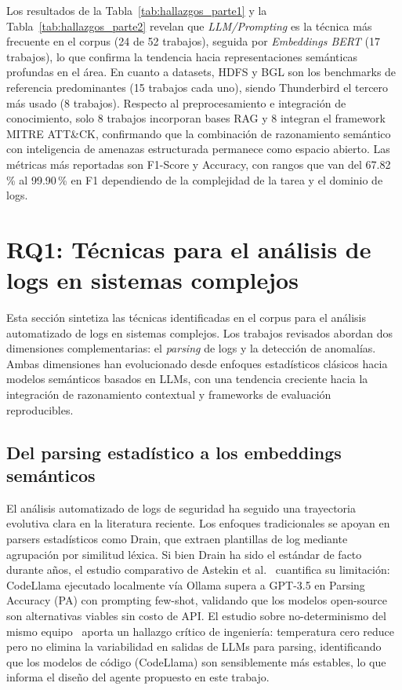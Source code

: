 Los resultados de la Tabla~\ref{tab:hallazgos_parte1} y la
Tabla~\ref{tab:hallazgos_parte2} revelan que \textit{LLM/Prompting}
es la técnica más frecuente en el corpus (24 de 52 trabajos),
seguida por \textit{Embeddings BERT} (17 trabajos), lo que confirma
la tendencia hacia representaciones semánticas profundas en el área.
En cuanto a datasets, HDFS y BGL son los benchmarks de referencia
predominantes (15 trabajos cada uno), siendo Thunderbird el tercero
más usado (8 trabajos). Respecto al preprocesamiento e integración
de conocimiento, solo 8 trabajos incorporan bases RAG y 8 integran
el framework MITRE ATT\&CK, confirmando que la combinación de
razonamiento semántico con inteligencia de amenazas estructurada
permanece como espacio abierto. Las métricas más reportadas son
F1-Score y Accuracy, con rangos que van del 67.82\,\% al 99.90\,\%
en F1 dependiendo de la complejidad de la tarea y el dominio de logs.
 


\section{RQ1: Técnicas para el análisis de logs en sistemas
  complejos}
Esta sección sintetiza las técnicas identificadas en el corpus para
el análisis automatizado de logs en sistemas complejos. Los trabajos
revisados abordan dos dimensiones complementarias: el \textit{parsing}
de logs y la detección de anomalías. Ambas
dimensiones han evolucionado desde enfoques estadísticos clásicos
hacia modelos semánticos basados en LLMs, con una tendencia creciente
hacia la integración de razonamiento contextual y frameworks de
evaluación reproducibles.

\subsection{Del parsing estadístico a los embeddings semánticos}

El análisis automatizado de logs de seguridad ha seguido una
trayectoria evolutiva clara en la literatura reciente. Los
enfoques tradicionales se apoyan en parsers estadísticos como
Drain, que extraen plantillas de log mediante agrupación por
similitud léxica. Si bien Drain ha sido el estándar de facto
durante años, el estudio comparativo de Astekin et
al.~\cite{astekin2024comparative} cuantifica su limitación:
CodeLlama ejecutado localmente vía Ollama supera a GPT-3.5 en
Parsing Accuracy (PA) con prompting few-shot, validando que
los modelos open-source son alternativas viables sin costo de
API. El estudio sobre no-determinismo del mismo equipo~\cite{astekin2024nondeterminism}
aporta un hallazgo crítico de ingeniería: temperatura cero
reduce pero no elimina la variabilidad en salidas de LLMs para
parsing, identificando que los modelos de código (CodeLlama)
son sensiblemente más estables, lo que informa el diseño del
agente propuesto en este trabajo.

